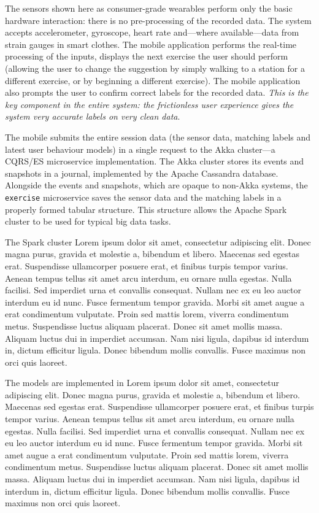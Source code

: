 \documentclass[a4paper, 10 pt, conference]{IEEEtran}
\begin{document}
The sensors shown here as consumer-grade wearables perform only the basic hardware interaction: there is no pre-processing of the recorded data. The system accepts accelerometer, gyroscope, heart rate and---where available---data from strain gauges in smart clothes. The mobile application performs the real-time processing of the inputs, displays the next exercise the user should perform (allowing the user to change the suggestion by simply walking to a station for a different exercise, or by beginning a different exercise). The mobile application also prompts the user to confirm correct labels for the recorded data. \emph{This is the key component in the entire system: the frictionless user experience gives the system very accurate labels on very clean data}.

The mobile submits the entire session data (the sensor data, matching labels and latest user behaviour models) in a single request to the Akka \cite{akka} cluster---a CQRS/ES \cite{cqrs-es} microservice implementation. The Akka cluster stores its events and snapshots in a journal, implemented by the Apache Cassandra \cite{apache-cassandra} database. Alongside the events and snapshots, which are opaque to non-Akka systems, the \texttt{exercise} microservice saves the sensor data and the matching labels in a properly formed tabular structure. This structure allows the Apache Spark \cite{apache-spark} cluster to be used for typical big data tasks.

The Spark cluster Lorem ipsum dolor sit amet, consectetur adipiscing elit. Donec magna purus, gravida et molestie a, bibendum et libero. Maecenas sed egestas erat. Suspendisse ullamcorper posuere erat, et finibus turpis tempor varius. Aenean tempus tellus sit amet arcu interdum, eu ornare nulla egestas. Nulla facilisi. Sed imperdiet urna et convallis consequat. Nullam nec ex eu leo auctor interdum eu id nunc. Fusce fermentum tempor gravida. Morbi sit amet augue a erat condimentum vulputate. Proin sed mattis lorem, viverra condimentum metus. Suspendisse luctus aliquam placerat. Donec sit amet mollis massa. Aliquam luctus dui in imperdiet accumsan. Nam nisi ligula, dapibus id interdum in, dictum efficitur ligula. Donec bibendum mollis convallis. Fusce maximus non orci quis laoreet.

The models are implemented in Lorem ipsum dolor sit amet, consectetur adipiscing elit. Donec magna purus, gravida et molestie a, bibendum et libero. Maecenas sed egestas erat. Suspendisse ullamcorper posuere erat, et finibus turpis tempor varius. Aenean tempus tellus sit amet arcu interdum, eu ornare nulla egestas. Nulla facilisi. Sed imperdiet urna et convallis consequat. Nullam nec ex eu leo auctor interdum eu id nunc. Fusce fermentum tempor gravida. Morbi sit amet augue a erat condimentum vulputate. Proin sed mattis lorem, viverra condimentum metus. Suspendisse luctus aliquam placerat. Donec sit amet mollis massa. Aliquam luctus dui in imperdiet accumsan. Nam nisi ligula, dapibus id interdum in, dictum efficitur ligula. Donec bibendum mollis convallis. Fusce maximus non orci quis laoreet.
\end{document}
